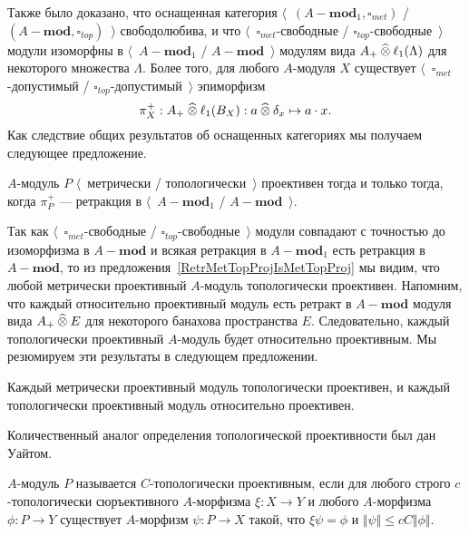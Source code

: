 Также было доказано, что оснащенная категория
$\langle$~$(A-\mathbf{mod}_1,\square_{met})$ /
$(A-\mathbf{mod},\square_{top})$~$\rangle$ свободолюбива, и что
$\langle$~$\square_{met}$-свободные / $\square_{top}$-свободные~$\rangle$ модули
изоморфны в $\langle$~$A-\mathbf{mod}_1$ / $A-\mathbf{mod}$~$\rangle$ модулям
вида $A_+\mathbin{\widehat{\otimes}} \ell_1(\Lambda)$ для некоторого множества $\Lambda$. Более
того, для любого $A$-модуля $X$ существует $\langle$~$\square_{met}$-допустимый
/ $\square_{top}$-допустимый~$\rangle$ эпиморфизм
$$
\pi_X^+:A_+\mathbin{\widehat{\otimes}} \ell_1(B_X):a\mathbin{\widehat{\otimes}} \delta_x\mapsto a\cdot x.
$$
Как следствие общих результатов об оснащенных категориях мы получаем следующее
предложение.

\begin{proposition}\label{MetTopProjModViaCanonicMorph} $A$-модуль $P$
$\langle$~метрически / топологически~$\rangle$ проективен тогда и только тогда,
когда  $\pi_P^+$ --- ретракция в $\langle$~$A-\mathbf{mod}_1$ /
$A-\mathbf{mod}$~$\rangle$.
\end{proposition}

Так как $\langle$~$\square_{met}$-свободные /
$\square_{top}$-свободные~$\rangle$ модули совпадают с точностью до изоморфизма
в $A-\mathbf{mod}$ и всякая ретракция в $A-\mathbf{mod}_1$ есть ретракция в
$A-\mathbf{mod}$, то из предложения~\ref{RetrMetTopProjIsMetTopProj} мы видим,
что любой метрически проективный $A$-модуль топологически проективен. Напомним,
что каждый относительно проективный модуль есть ретракт в $A-\mathbf{mod}$
модуля вида $A_+\mathbin{\widehat{\otimes}} E$ для некоторого банахова пространства $E$.
Следовательно, каждый топологически проективный $A$-модуль будет относительно
проективным. Мы резюмируем эти результаты в следующем предложении.

\begin{proposition}\label{MetProjIsTopProjAndTopProjIsRelProj} Каждый метрически
проективный модуль топологически проективен, и каждый топологически проективный
модуль относительно проективен.
\end{proposition}

Количественный аналог определения топологической проективности был дан Уайтом.

\begin{definition}\label{CTopProjMod}
$A$-модуль $P$ называется $C$-топологически проективным, если для любого строго
$c$-топологически сюръективного $A$-морфизма $\xi:X\to Y$ и любого $A$-морфизма
$\phi:P\to Y$ существует $A$-морфизм $\psi:P\to X$ такой, что $\xi\psi=\phi$ и
$\Vert\psi\Vert\leq cC\Vert\phi\Vert$.
\end{definition}

